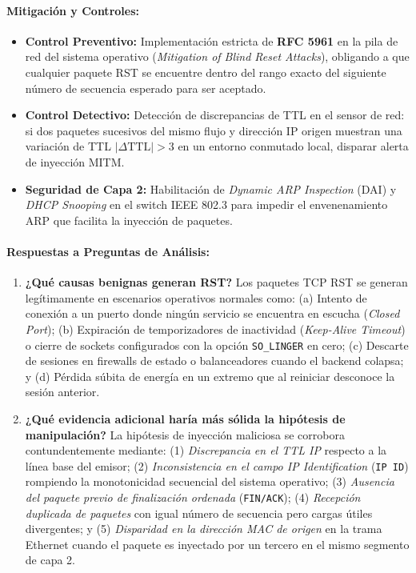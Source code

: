 \documentclass[11pt,letterpaper]{article}
\begin{document}
\paragraph{Mitigación y Controles:}
\begin{itemize}
    \item \textbf{Control Preventivo:} Implementación estricta de \textbf{RFC 5961} en la pila de red del sistema operativo (\textit{Mitigation of Blind Reset Attacks}), obligando a que cualquier paquete RST se encuentre dentro del rango exacto del siguiente número de secuencia esperado para ser aceptado.
    \item \textbf{Control Detectivo:} Detección de discrepancias de TTL en el sensor de red: si dos paquetes sucesivos del mismo flujo y dirección IP origen muestran una variación de TTL $|\Delta \text{TTL}| > 3$ en un entorno conmutado local, disparar alerta de inyección MITM.
    \item \textbf{Seguridad de Capa 2:} Habilitación de \textit{Dynamic ARP Inspection} (DAI) y \textit{DHCP Snooping} en el switch IEEE 802.3 para impedir el envenenamiento ARP que facilita la inyección de paquetes.
\end{itemize}

\paragraph{Respuestas a Preguntas de Análisis:}
\begin{enumerate}
    \item \textbf{¿Qué causas benignas generan RST?} Los paquetes TCP RST se generan legítimamente en escenarios operativos normales como: (a) Intento de conexión a un puerto donde ningún servicio se encuentra en escucha (\textit{Closed Port}); (b) Expiración de temporizadores de inactividad (\textit{Keep-Alive Timeout}) o cierre de sockets configurados con la opción \texttt{SO\_LINGER} en cero; (c) Descarte de sesiones en firewalls de estado o balanceadores cuando el backend colapsa; y (d) Pérdida súbita de energía en un extremo que al reiniciar desconoce la sesión anterior.
    \item \textbf{¿Qué evidencia adicional haría más sólida la hipótesis de manipulación?} La hipótesis de inyección maliciosa se corrobora contundentemente mediante: (1) \textit{Discrepancia en el TTL IP} respecto a la línea base del emisor; (2) \textit{Inconsistencia en el campo IP Identification} (\texttt{IP ID}) rompiendo la monotonicidad secuencial del sistema operativo; (3) \textit{Ausencia del paquete previo de finalización ordenada} (\texttt{FIN/ACK}); (4) \textit{Recepción duplicada de paquetes} con igual número de secuencia pero cargas útiles divergentes; y (5) \textit{Disparidad en la dirección MAC de origen} en la trama Ethernet cuando el paquete es inyectado por un tercero en el mismo segmento de capa 2.
\end{enumerate}
\end{document}
